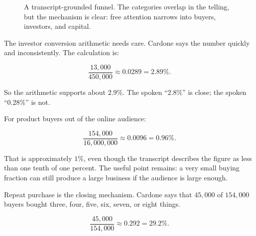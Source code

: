 \begin{figure}
\centering
{}
\caption{A transcript-grounded funnel. The categories overlap in the telling, but the mechanism is clear: free attention narrows into buyers, investors, and capital.}
\end{figure}

The investor conversion arithmetic needs care. Cardone says the number quickly and inconsistently. The calculation is:

\begin{equation}
\frac{13{,}000}{450{,}000}
\approx
0.0289
=
2.89\%.
\end{equation}

So the arithmetic supports about \(2.9\%\). The spoken ``2.8\%'' is close; the spoken ``0.28\%'' is not.

For product buyers out of the online audience:

\begin{equation}
\frac{154{,}000}{16{,}000{,}000}
\approx
0.0096
=
0.96\%.
\end{equation}

That is approximately \(1\%\), even though the transcript describes the figure as less than one tenth of one percent. The useful point remains: a very small buying fraction can still produce a large business if the audience is large enough.

Repeat purchase is the closing mechanism. Cardone says that \(45{,}000\) of \(154{,}000\) buyers bought three, four, five, six, seven, or eight things.

\begin{equation}
\frac{45{,}000}{154{,}000}
\approx
0.292
=
29.2\%.
\end{equation}


